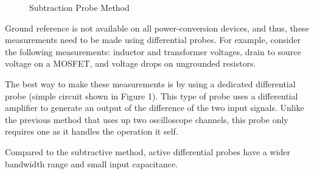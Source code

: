 \documentclass[11pt]{article}
\begin{document}
\begin{figure}[h] %
    \centering
    \caption{Subtraction Probe Method}
    \label{fig:SUB}
\end{figure}


Ground reference is not available on all power-conversion devices, and thus, these measurements need to be made using differential probes. For example, consider the following measurements: inductor and transformer voltages, drain to source voltage on a MOSFET, and voltage drops on ungrounded resistors. 

\vspace{1em}

\noindent The best way to make these measurements is by using a dedicated differential probe (simple circuit shown in Figure 1). This type of probe uses a differential amplifier to generate an output of the difference of the two input signals. Unlike the previous method that uses up two oscilloscope channels, this probe only requires one as it handles the operation it self. 

\vspace{1em}

\noindent Compared to the subtractive method, active differential probes have a wider bandwidth range and small input capacitance. 
\end{document}
